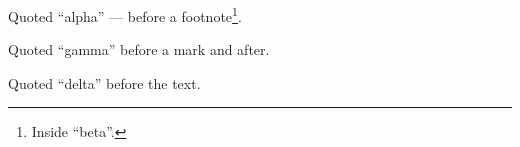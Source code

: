 \documentclass{article}
\begin{document}
Quoted ``alpha'' --- before a footnote\footnote{Inside ``beta''.}.

Quoted ``gamma'' before a mark\footnotemark{} and after.

Quoted ``delta'' before the text.
\end{document}

